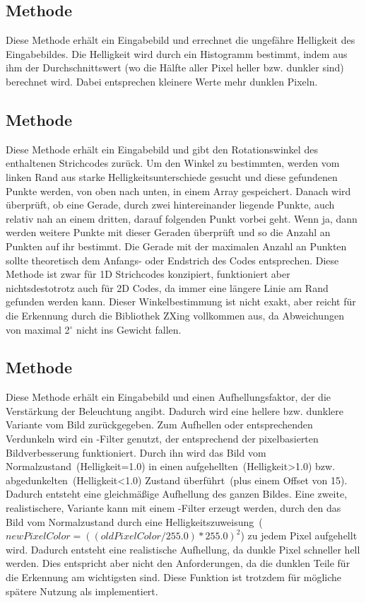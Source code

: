 \subsection*{Methode }
Diese Methode erhält ein Eingabebild und errechnet die ungefähre Helligkeit des Eingabebildes.
Die Helligkeit wird durch ein Histogramm bestimmt, indem aus ihm der Durchschnittswert (wo die Hälfte aller Pixel heller bzw. dunkler sind) berechnet wird. Dabei entsprechen kleinere Werte mehr dunklen Pixeln.


\subsection*{Methode }
Diese Methode erhält ein Eingabebild und gibt den Rotationswinkel des enthalten\-en Strichcodes zurück.
Um den Winkel zu bestimmten, werden vom linken Rand aus starke Helligkeitsunterschiede gesucht und diese gefundenen Punkte werden, von oben nach unten, in einem Array gespeichert. Danach wird überprüft, ob eine Gerade, durch zwei hintereinander liegende Punkte, auch relativ nah an einem dritten, darauf folgenden Punkt vorbei geht. Wenn ja, dann werden weitere Punkte mit dieser Geraden überprüft und so die Anzahl an Punkten auf ihr bestimmt. Die Gerade mit der maximalen Anzahl an Punkten sollte theoretisch dem Anfangs- oder Endstrich des Codes entsprechen.
Diese Methode ist zwar für 1D Strichcodes konzipiert, funktioniert aber nichtsdestotrotz auch für 2D Codes, da immer eine längere Linie am Rand gefunden werden kann.
Dieser Winkelbestimmung ist nicht exakt, aber reicht für die Erkennung durch die Bibliothek ZXing vollkommen aus, da Abweichungen von maximal 2$^\circ $ nicht ins Gewicht fallen.
 

\subsection*{Methode }
Diese Methode erhält ein Eingabebild und einen Aufhellungsfaktor, der die Verstärkung der Beleuchtung angibt. Dadurch wird eine hellere bzw. dunklere Variante vom Bild zurückgegeben.
Zum Aufhellen oder entsprechenden Verdunkeln wird ein -Filter genutzt, der entsprechend der pixelbasierten Bildverbesserung funktioniert. Durch ihn wird das Bild vom Normalzustand~(Helligkeit=1.0) in einen aufgehellten~(Helligkeit>1.0) bzw. abgedunkelten~(Helligkeit<1.0) Zustand überführt~(plus einem Offset von 15).
Dadurch entsteht eine gleichmäßige Aufhellung des ganzen Bildes.
Eine zweite, realistischere, Variante kann mit einem -Filter erzeugt werden, durch den das Bild vom Normalzustand durch eine Helligkeitszuweisung~($newPixelColor = ((oldPixelColor/255.0) * 255.0)^2$) zu jedem Pixel aufgehellt wird.
Dadurch entsteht eine realistische Aufhellung, da dunkle Pixel schneller hell werden. Dies entspricht aber nicht den Anforderungen, da die dunklen Teile für die Erkennung am wichtigsten sind. Diese Funktion ist trotzdem für mögliche spätere Nutzung als  implementiert.


